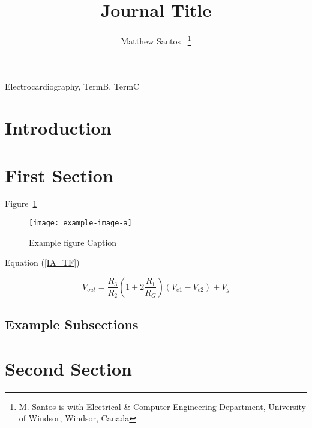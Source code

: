 \documentclass[conference]{templates/IEEEtran}
\begin{document}
\title{Journal Title}

\author{
	Matthew Santos~
	\thanks{M. Santos is with Electrical \& Computer Engineering Department, University of Windsor, Windsor, Canada}
}

\maketitle

\begin{abstract} %
	\lipsum[1]
\end{abstract}

\begin{IEEEkeywords} %
	Electrocardiography, TermB, TermC
\end{IEEEkeywords}

\section{Introduction} 

	\lipsum[2]

\section{First Section}

	\lipsum[3] 
	
	Figure~\ref{myfig}

	\begin{figure}[!b] %
		\centering
		\texttt{[image: example-image-a]}
		\caption{Example figure Caption}
		\label{myfig}
	\end{figure}

	Equation (\ref{IA_TF})

	\begin{equation}
		V_{out} = \frac{R_3}{R_2}\left(1+2\frac{R_1}{R_G}\right)(V_{e1}-V_{e2})+V_g
		\label{IA_TF}
	\end{equation}

\newpage %

	\subsection{Example Subsections}
		\lipsum[4]

\section{Second Section}
\end{document}
